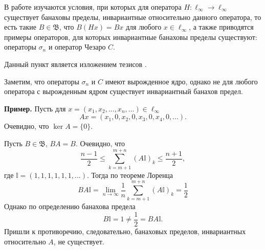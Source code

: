 В работе \cite{Semenov2010invariant} изучаются условия,
при которых для оператора $H:\ell_\infty\to \ell_\infty$ существует банаховы пределы,
инвариантные относительно данного оператора, то есть такие $B\in\mathfrak{B}$,
что $B(Hx) = Bx$ для любого $x\in\ell_\infty$,
а также приводятся примеры операторов, для которых инвариантные банаховы пределы существуют:
операторы $\sigma_n$ и оператор Чезаро $C$.

Данный пункт является изложением тезисов \cite{our-vvmsh-2018}.

Заметим, что операторы $\sigma_n$ и $C$ имеют вырожденное ядро,
однако не для любого оператора с вырожденным ядром существует инвариантный банахов предел.

\textbf{Пример.}
Пусть для $x = (x_1, x_2, ..., x_n, ...)\in \ell_\infty$
\begin{equation*}
	Ax = (x_1, 0, x_2, 0, x_3, 0, x_4, 0, ...).
\end{equation*}
Очевидно, что $\ker A = \{0\}$.

Пусть $B\in\mathfrak{B}$, $BA = B$.
Очевидно, что
\begin{equation*}
	\frac{n-1}{2}\leqslant \sum_{k=m+1}^{m+n} (A\mathbb{I})_k \leqslant \frac{n+1}{2},
\end{equation*}
где $\mathbb{I} = (1, 1, 1, 1, 1, 1, ...)$.
Тогда по теореме Лоренца
\begin{equation*}
	BA\mathbb{I} =
	\lim_{n\to\infty} \frac{1}{n}\sum_{k=m+1}^{m+n} (A\mathbb{I})_k = \frac{1}{2}
\end{equation*}
Однако по определению банахова предела
\begin{equation*}
	B\mathbb{I} = 1 \neq \frac{1}{2} = BA\mathbb{I}.
\end{equation*}
Пришли к противоречию, следовательно, банаховых пределов, инвариантных относительно $A$, не существует.
